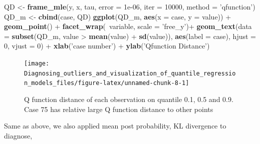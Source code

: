 \documentclass[11pt,a4paper,]{article}
\newenvironment{Shaded}{\begin{snugshade}}{\end{snugshade}}
\newcommand{\KeywordTok}[1]{\textcolor[rgb]{0.13,0.29,0.53}{\textbf{{#1}}}}
\newcommand{\DataTypeTok}[1]{\textcolor[rgb]{0.13,0.29,0.53}{{#1}}}
\newcommand{\DecValTok}[1]{\textcolor[rgb]{0.00,0.00,0.81}{{#1}}}
\newcommand{\FloatTok}[1]{\textcolor[rgb]{0.00,0.00,0.81}{{#1}}}
\newcommand{\StringTok}[1]{\textcolor[rgb]{0.31,0.60,0.02}{{#1}}}
\newcommand{\NormalTok}[1]{{#1}}
\theoremstyle{definition}
\theoremstyle{definition}
\theoremstyle{remark}
\begin{document}
\begin{Shaded}
\begin{Highlighting}[]
\NormalTok{QD <-}\StringTok{ }\KeywordTok{frame_mle}\NormalTok{(y, x, tau, }\DataTypeTok{error =} \FloatTok{1e-06}\NormalTok{, }\DataTypeTok{iter =} \DecValTok{10000}\NormalTok{,}
               \DataTypeTok{method =} \StringTok{'qfunction'}\NormalTok{)}
\NormalTok{QD_m <-}\StringTok{ }\KeywordTok{cbind}\NormalTok{(case, QD)}
\KeywordTok{ggplot}\NormalTok{(QD_m, }\KeywordTok{aes}\NormalTok{(}\DataTypeTok{x =} \NormalTok{case, }\DataTypeTok{y =} \NormalTok{value)) +}
\StringTok{ }\KeywordTok{geom_point}\NormalTok{() +}
\StringTok{ }\KeywordTok{facet_wrap}\NormalTok{(~variable, }\DataTypeTok{scale =} \StringTok{'free_y'}\NormalTok{)+}
\StringTok{ }\KeywordTok{geom_text}\NormalTok{(}\DataTypeTok{data =} \KeywordTok{subset}\NormalTok{(QD_m, value >}\StringTok{ }\KeywordTok{mean}\NormalTok{(value) +}\StringTok{ }\KeywordTok{sd}\NormalTok{(value)),}
           \KeywordTok{aes}\NormalTok{(}\DataTypeTok{label =} \NormalTok{case), }\DataTypeTok{hjust =} \DecValTok{0}\NormalTok{, }\DataTypeTok{vjust =} \DecValTok{0}\NormalTok{) +}
\StringTok{ }\KeywordTok{xlab}\NormalTok{(}\StringTok{'case number'}\NormalTok{) +}
\StringTok{ }\KeywordTok{ylab}\NormalTok{(}\StringTok{'Qfunction Distance'}\NormalTok{)}
\end{Highlighting}
\end{Shaded}

\begin{figure}

{\centering \texttt{[image: Diagnosing\_outliers\_and\_visualization\_of\_quantile\_regression\_models\_files/figure-latex/unnamed-chunk-8-1]} 

}

\caption{Q function distance of each observation on quantile 0.1, 0.5 and 0.9. Case 75 has relative large Q function distance to other points}\label{fig:unnamed-chunk-8}
\end{figure}

Same as above, we also applied mean post probability, KL divergence to
diagnose,
\end{document}
